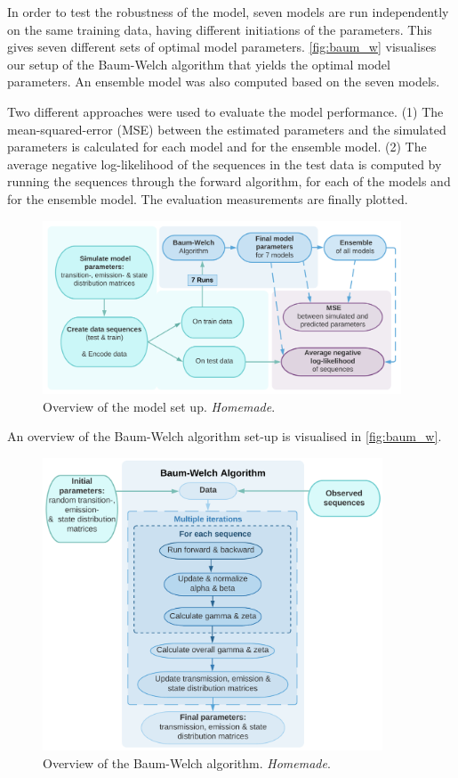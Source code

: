 In order to test the robustness of the model, seven models are run independently on the same training data, having different initiations of the parameters. This gives seven different sets of optimal model parameters. \autoref{fig:baum_w} visualises our setup of the Baum-Welch algorithm that yields the optimal model parameters. An ensemble model was also computed based on the seven models.

Two different approaches were used to evaluate the model performance. (1) The mean-squared-error (MSE) between the estimated parameters and the simulated parameters is calculated for each model and for the ensemble model. (2) The average negative log-likelihood of the sequences in the test data is computed by running the sequences through the forward algorithm, for each of the models and for the ensemble model. The evaluation measurements are finally plotted.

\begin{figure}[H]
    \centering
    \includegraphics[width = 0.95\textwidth]{fig/Overall_setup.png}
    \caption{Overview of the model set up. \textit{Homemade}.}
    \label{fig:set_up}
\end{figure}

An overview of the Baum-Welch algorithm set-up is visualised in \autoref{fig:baum_w}. 
\begin{figure}[H]
    \centering
    \includegraphics[width = 0.9\textwidth]{fig/baum_welch.png}
    \caption{Overview of the Baum-Welch algorithm. \textit{Homemade}.}
    \label{fig:baum_w}
\end{figure}

